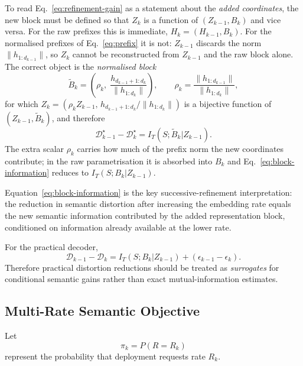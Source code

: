 \documentclass[11pt]{article}
\newcommand{\cD}{\mathcal{D}}
\begin{document}
To read Eq.~\eqref{eq:refinement-gain} as a statement about the \emph{added coordinates}, the new block must be defined so that $Z_k$ is a function of $(Z_{k-1},B_k)$ and vice versa.
For the raw prefixes this is immediate, $H_k=(H_{k-1},B_k)$.
For the normalised prefixes of Eq.~\eqref{eq:prefix} it is not: $Z_{k-1}$ discards the norm $\|h_{1:d_{k-1}}\|$, so $Z_k$ cannot be reconstructed from $Z_{k-1}$ and the raw block alone.
The correct object is the \emph{normalised block}
\begin{equation}
    \widetilde B_k
    =
    \left(
        \rho_k,\;
        \frac{h_{d_{k-1}+1:d_k}}{\|h_{1:d_k}\|}
    \right),
    \qquad
    \rho_k=\frac{\|h_{1:d_{k-1}}\|}{\|h_{1:d_k}\|},
\end{equation}
for which $Z_k=(\rho_k Z_{k-1},\,h_{d_{k-1}+1:d_k}/\|h_{1:d_k}\|)$ is a bijective function of $(Z_{k-1},\widetilde B_k)$, and therefore
\begin{equation}
\boxed{
    \cD_{k-1}^\star-\cD_k^\star
    =
    I_T(S;\widetilde B_k|Z_{k-1}).
}
\label{eq:block-information}
\end{equation}
The extra scalar $\rho_k$ carries how much of the prefix norm the new coordinates contribute; in the raw parametrisation it is absorbed into $B_k$ and Eq.~\eqref{eq:block-information} reduces to $I_T(S;B_k|Z_{k-1})$.

Equation~\eqref{eq:block-information} is the key successive-refinement interpretation:
the reduction in semantic distortion after increasing the embedding rate equals the new semantic information contributed by the added representation block, conditioned on information already available at the lower rate.

For the practical decoder,
\begin{equation}
    \cD_{k-1}-\cD_k
    =
    I_T(S;B_k|Z_{k-1})
    +
    (\epsilon_{k-1}-\epsilon_k).
\end{equation}
Therefore practical distortion reductions should be treated as \emph{surrogates} for conditional semantic gains rather than exact mutual-information estimates.


\subsection{Multi-Rate Semantic Objective}

Let
\begin{equation}
    \pi_k
    =
    P(R=R_k)
\end{equation}
represent the probability that deployment requests rate $R_k$.
\end{document}

